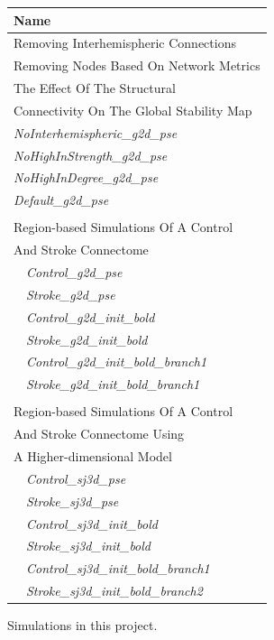\documentclass{tufte-handout}
\begin{document}
\begin{margintable}
  \centering
  \selectfont
  \begin{tabular}{l}
    \toprule
    Name                                              \\
    \midrule
    \multicolumn{1}{l}{Removing Interhemispheric Connections}\\
    \multicolumn{1}{l}{Removing Nodes Based On Network Metrics}\\
    \multicolumn{1}{l}{The Effect Of The Structural}\\
    \multicolumn{1}{l}{Connectivity On The Global Stability Map}\\
    \textit{NoInterhemispheric\_g2d\_pse}\\
    \textit{NoHighInStrength\_g2d\_pse}\\
    \textit{NoHighInDegree\_g2d\_pse}\\
    \textit{Default\_g2d\_pse}\\
     \\
	\multicolumn{1}{l}{Region-based Simulations Of A Control }\\
    \multicolumn{1}{l}{And Stroke Connectome}\\

    $\quad$\textit{Control\_g2d\_pse}           \\
    $\quad$\textit{Stroke\_g2d\_pse}             \\
    $\quad$\textit{Control\_g2d\_init\_bold} \\
    $\quad$\textit{Stroke\_g2d\_init\_bold}        \\  
    $\quad$\textit{Control\_g2d\_init\_bold\_branch1}           \\
    $\quad$\textit{Stroke\_g2d\_init\_bold\_branch1} \\ 
    \\
    \multicolumn{1}{l}{Region-based Simulations Of A Control  }\\
    \multicolumn{1}{l}{And Stroke Connectome Using}\\
    \multicolumn{1}{l}{A Higher-dimensional Model}\\
    $\quad$\textit{Control\_sj3d\_pse}\\
    $\quad$\textit{Stroke\_sj3d\_pse}\\
    $\quad$\textit{Control\_sj3d\_init\_bold}\\
    $\quad$\textit{Stroke\_sj3d\_init\_bold}\\
    $\quad$\textit{Control\_sj3d\_init\_bold\_branch1}\\
    $\quad$\textit{Stroke\_sj3d\_init\_bold\_branch2}\\
    \bottomrule
  \end{tabular}
  \caption{Simulations in this project.}
  \label{tab:normaltab}
\end{margintable}
\end{document}
